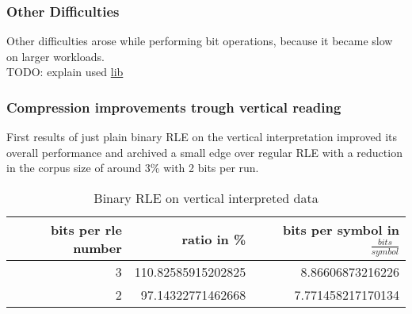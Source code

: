\subsubsection{Other Difficulties}
\par{
Other difficulties arose while performing bit operations, because it became slow on larger workloads. \\

TODO: explain used \href{https://discuss.kotlinlang.org/t/i-o-streams-for-kotlin/9802}{lib}}

\subsubsection{Compression improvements trough vertical reading}
\par{
First results of just plain binary RLE on the vertical interpretation improved its overall performance and archived a small edge over regular RLE with a reduction in the corpus size of around 3\% with 2 bits per run. 
\begin{table}[h]
	\centering
	\begin{tabular}{r|r|r}	
		bits per rle number & ratio in \% & bits per symbol in $\frac{bits}{symbol}$\\
		\hline
		3 & 110.82585915202825 & 8.86606873216226\\
		2 & 97.14322771462668 & 7.771458217170134 \\
	\end{tabular}
	\caption{Binary RLE on vertical interpreted data}
	\label{tab:t30 binary RLE on vertical interpreted data}
\end{table}
}

